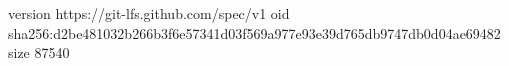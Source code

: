 version https://git-lfs.github.com/spec/v1
oid sha256:d2be481032b266b3f6e57341d03f569a977e93e39d765db9747db0d04ae69482
size 87540
